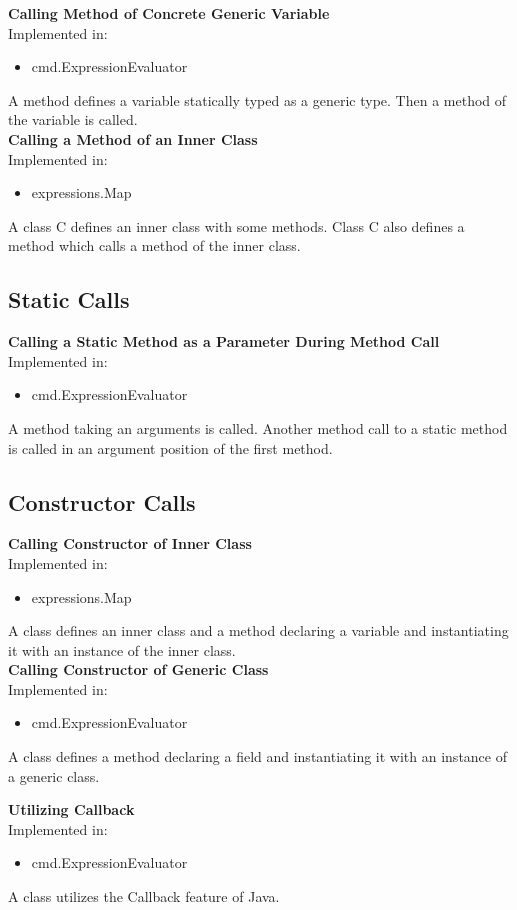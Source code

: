 \documentclass{article}
\begin{document}
\noindent
\textbf{Calling Method of Concrete Generic Variable}\\
Implemented in: 
\begin{itemize}
    \item cmd.ExpressionEvaluator
\end{itemize}
A method defines a variable statically typed as a generic type. Then a method of the variable is called.\\

\noindent
\textbf{Calling a Method of an Inner Class}\\
Implemented in: 
\begin{itemize}
    \item expressions.Map
\end{itemize}
A class C defines an inner class with some methods. Class C also defines a method which calls a method of the inner class.\\

\subsection{Static Calls}

\textbf{Calling a Static Method as a Parameter During Method Call}\\
Implemented in: 
\begin{itemize}
    \item cmd.ExpressionEvaluator
\end{itemize}
A method taking an arguments is called. Another method call to a static method is called in an argument position of the first method.\\

\subsection{Constructor Calls}

\textbf{Calling Constructor of Inner Class}\\
Implemented in: 
\begin{itemize}
    \item expressions.Map
\end{itemize}
A class defines an inner class and a method declaring a variable and instantiating it with an instance of the inner class.\\

\noindent
\textbf{Calling Constructor of Generic Class}\\
Implemented in: 
\begin{itemize}
    \item cmd.ExpressionEvaluator
\end{itemize}
A class defines a method declaring a field and instantiating it with an instance of a generic class.\\



\textbf{Utilizing Callback}\\
Implemented in: 
\begin{itemize}
    \item cmd.ExpressionEvaluator
\end{itemize}
A class utilizes the Callback feature of Java.\\
\end{document}
